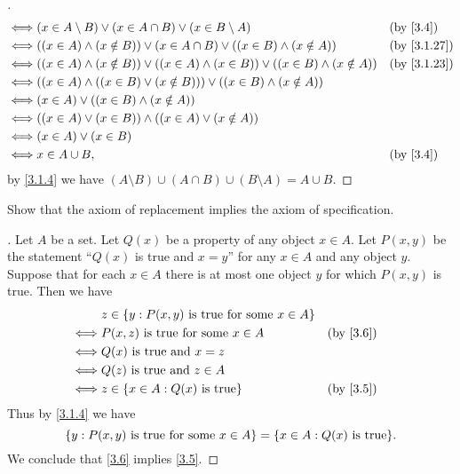 \begin{proof}[]
\begin{align*}
    \iff & (x \in A \setminus B) \lor (x \in A \cap B) \lor (x \in B \setminus A)                              &  & \by{3.4}    \\
    \iff & ((x \in A) \land (x \notin B)) \lor (x \in A \cap B) \lor ((x \in B) \land (x \notin A))            &  & \by{3.1.27} \\
    \iff & ((x \in A) \land (x \notin B)) \lor ((x \in A) \land (x \in B)) \lor ((x \in B) \land (x \notin A)) &  & \by{3.1.23} \\
    \iff & ((x \in A) \land ((x \in B) \lor (x \notin B))) \lor ((x \in B) \land (x \notin A))                                  \\
    \iff & (x \in A) \lor ((x \in B) \land (x \notin A))                                                                        \\
    \iff & ((x \in A) \lor (x \in B)) \land ((x \in A) \lor (x \notin A))                                                       \\
    \iff & (x \in A) \lor (x \in B)                                                                                             \\
    \iff & x \in A \cup B,                                                                                     &  & \by{3.4}
  \end{align*}
  by \cref{3.1.4} we have \((A \setminus B) \cup (A \cap B) \cup (B \setminus A) = A \cup B\).
\end{proof}

\begin{ex}\label{ex:3.1.11}
  Show that the axiom of replacement implies the axiom of specification.
\end{ex}

\begin{proof}[]
  Let \(A\) be a set.
  Let \(Q(x)\) be a property of any object \(x \in A\).
  Let \(P(x, y)\) be the statement ``\(Q(x)\) is true and \(x = y\)'' for any \(x \in A\) and any object \(y\).
  Suppose that for each \(x \in A\) there is at most one object \(y\) for which \(P(x, y)\) is true.
  Then we have
  \begin{align*}
         & z \in \set{y : P(x, y) \text{ is true for some } x \in A}               \\
    \iff & P(x, z) \text{ is true for some } x \in A                 &  & \by{3.6} \\
    \iff & Q(x) \text{ is true and } x = z                                         \\
    \iff & Q(z) \text{ is true and } z \in A                                       \\
    \iff & z \in \set{x \in A : Q(x) \text{ is true}}                &  & \by{3.5}
  \end{align*}
  Thus by \cref{3.1.4} we have
  \[
    \set{y : P(x, y) \text{ is true for some } x \in A} = \set{x \in A : Q(x) \text{ is true}}.
  \]
  We conclude that \cref{3.6} implies \cref{3.5}.
\end{proof}
